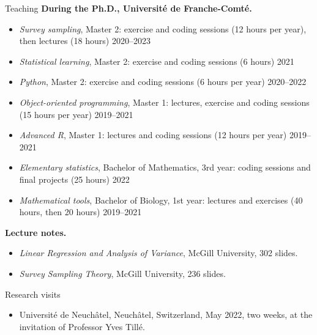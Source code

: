 \documentclass{resume}
\begin{document}
\begin{rSection}{Teaching}
\textbf{During the Ph.D., Université de Franche-Comté.}
\begin{itemize}
  \item[--] \emph{Survey sampling}, Master 2: exercise and coding sessions (12 hours per year), then lectures (18 hours) \hfill 2020--2023
  \item[--] \emph{Statistical learning}, Master 2: exercise and coding sessions (6 hours) \hfill 2021
  \item[--] \emph{Python}, Master 2: exercise and coding sessions (6 hours per year) \hfill 2020--2022
  \item[--] \emph{Object-oriented programming}, Master 1: lectures, exercise and coding sessions (15 hours per year) \hfill 2019--2021
  \item[--] \emph{Advanced R}, Master 1: lectures and coding sessions (12 hours per year) \hfill 2019--2021
  \item[--] \emph{Elementary statistics}, Bachelor of Mathematics, 3rd year: coding sessions and final projects (25 hours) \hfill 2022
  \item[--] \emph{Mathematical tools}, Bachelor of Biology, 1st year: lectures and exercises (40 hours, then 20 hours) \hfill 2019--2021
\end{itemize}

\textbf{Lecture notes.}
\begin{itemize}
  \item[--] \emph{Linear Regression and Analysis of Variance}, McGill University, 302 slides.
  \item[--] \emph{Survey Sampling Theory}, McGill University, 236 slides.
\end{itemize}
\end{rSection}

\begin{rSection}{Research visits}
\vspace{2mm}
\begin{itemize}
  \item[--] Université de Neuchâtel, Neuchâtel, Switzerland, May 2022, two weeks, at the invitation of Professor Yves Tillé.
\end{itemize}
\end{rSection}
\end{document}
